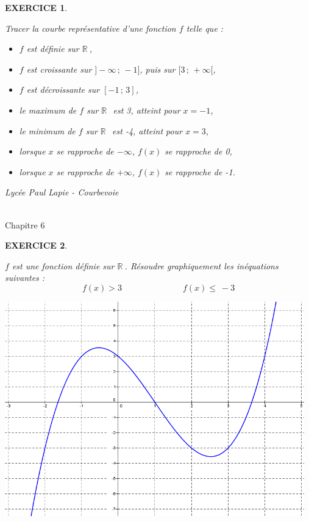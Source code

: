 \documentclass[a4paper]{article}   %
\renewcommand{\(}{\left(}
\renewcommand{\)}{\right)}
\newtheorem{EXO}{\large EXERCICE }
\newenvironment{EX}   { \setcounter{ques}{0} \begin{EXO} \hrulefill ~\vspace{0.3cm}

\normalfont}    {\end{EXO} \medskip}
\newcommand{\R}{ ${\mathbb R} ~$}
\newcommand{\ie}{\leqslant ~}  		%
\def\cl{{\Large \bf{2nde}}}
\begin{document}
\begin{EX}
Tracer la courbe représentative d'une fonction $f$ telle que :
\begin{itemize}
\item $f$ est définie sur \R ,
\item $f$ est croissante sur $] - \infty \,;\, -1 ]$, puis sur $ [3 \,;\, + \infty[$, 
\item $f$ est décroissante sur $[-1\,;\,3]$,
\item le maximum de $f$ sur \R~est 3, atteint pour $x=-1$,
\item le minimum de $f$ sur \R~est -4, atteint pour $x=3$,
\item lorsque $x$ se rapproche de $-\infty$, $f(x)$ se rapproche de 0,
\item lorsque $x$ se rapproche de $+\infty$, $f(x)$ se rapproche de -1. \end{itemize}

\end{EX}
\newpage \setcounter{EXO}{0}
\noindent\begin{minipage}{.20\linewidth}\begin{center}                  
\noindent \emph{Lycée Paul Lapie - Courbevoie}
\end{center}\end{minipage}
\begin{minipage}{1.5\linewidth}\begin{center}	
\noindent \cl \\ Chapitre 6
\end{center}\end{minipage}

\begin{center} 	
\end{center}

\begin{EX}
$f$ est une fonction définie sur \R. Résoudre graphiquement les inéquations suivantes : 
$$f(x) > 3 \hspace{3cm} f(x) \ie -3$$
\begin{center}
\includegraphics[width=13cm]{6ine.png}
\end{center}
\end{EX}
\end{document}
